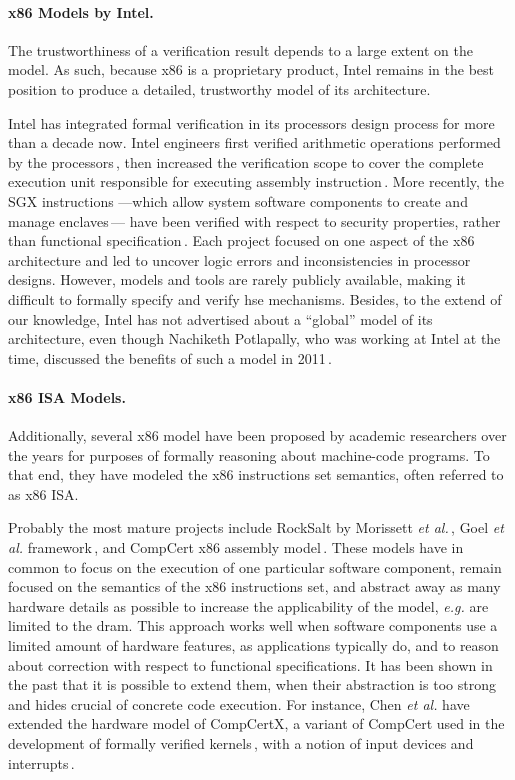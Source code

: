 \paragraph{x86 Models by Intel.}
%
The trustworthiness of a verification result depends to a large extent on the
model.
%
As such, because x86 is a proprietary product, Intel remains in the best
position to produce a detailed, trustworthy model of its architecture.

Intel has integrated formal verification in its processors design process for
more than a decade now.
%
Intel engineers first verified arithmetic operations performed by the
processors\,\cite{harrison2000x86}, then increased the verification scope to
cover the complete execution unit responsible for executing assembly
instruction\,\cite{kaivola2009formalintel}.
%
More recently, the SGX instructions ---which allow system software components to
create and manage enclaves\,\cite{costan2016sgxexplained}--- have been verified
with respect to security properties, rather than functional
specification\,\cite{leslie2015linsgx}.
%
Each project focused on one aspect of the x86 architecture and led to uncover
logic errors and inconsistencies in processor designs.
%
However, models and tools are rarely publicly available, making it difficult to
formally specify and verify \ac{hse} mechanisms.
%
Besides, to the extend of our knowledge, Intel has not advertised about a
``global'' model of its architecture, even though Nachiketh Potlapally, who was
working at Intel at the time, discussed the benefits of such a model in
2011\,\cite{potlapally2011hardwaresecurity}.

\paragraph{x86 ISA Models.}
%
Additionally, several x86 model have been proposed by academic researchers over
the years for purposes of formally reasoning about machine-code programs.
%
To that end, they have modeled the x86 instructions set semantics, often
referred to as x86 ISA.

Probably the most mature projects include RockSalt by Morissett \emph{et
  al.}\,\cite{morrisett2012rocksalt}, Goel \emph{et al.}
framework\,\cite{goel2014x86}, and CompCert x86 assembly
model\,\cite{leroy2012compcert}.
%
These models have in common to focus on the execution of one particular software
component, remain focused on the semantics of the x86 instructions set, and
abstract away as many hardware details as possible to increase the applicability
of the model, \emph{e.g.} are limited to the \ac{dram}.
%
This approach works well when software components use a limited amount of
hardware features, as applications typically do, and to reason about correction
with respect to functional specifications.
%
It has been shown in the past that it is possible to extend them, when their
abstraction is too strong and hides crucial of concrete code execution.
%
For instance, Chen \emph{et al.} have extended the hardware model of CompCertX,
a variant of CompCert used in the development of formally verified
kernels\,\cite{gu2016certikos}, with a notion of input devices and
interrupts\,\cite{chen2018interrupt}.

